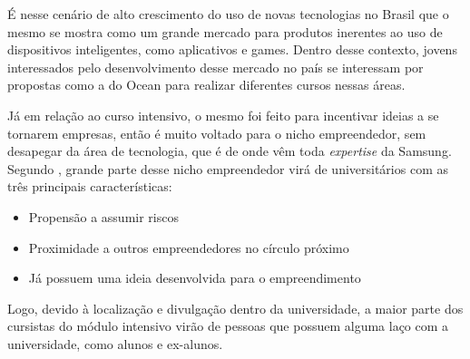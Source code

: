 É nesse cenário de alto crescimento do uso de novas tecnologias no Brasil que o mesmo se mostra como um grande mercado para produtos inerentes ao uso de dispositivos inteligentes, como aplicativos e games. Dentro desse contexto, jovens interessados pelo desenvolvimento desse mercado no país se interessam por propostas como a do Ocean para realizar diferentes cursos nessas áreas.

Já em relação ao curso intensivo, o mesmo foi feito para incentivar ideias a se tornarem empresas, então é muito voltado para o nicho empreendedor, sem desapegar da área de tecnologia, que é de onde vêm toda \textit{expertise} da Samsung. Segundo , grande parte desse nicho empreendedor virá de universitários com as três principais características:

\begin{itemize}
\item Propensão a assumir riscos
\item Proximidade a outros empreendedores no círculo próximo
\item Já possuem uma ideia desenvolvida para o empreendimento
\end{itemize}

Logo, devido à localização e divulgação dentro da universidade, a maior parte dos cursistas do módulo intensivo virão de pessoas que possuem alguma laço com a universidade, como alunos e ex-alunos.